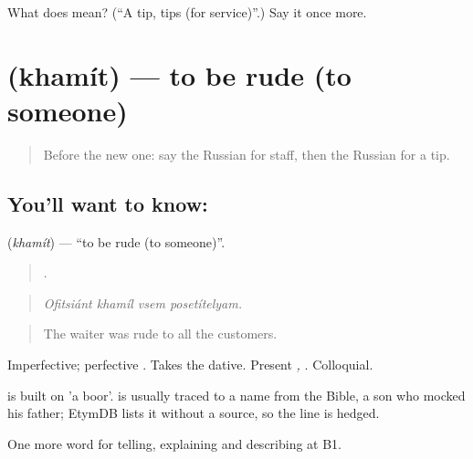 \begin{tcolorbox}[breakable,colback=teal!4,colframe=teal!35!black,title={Before you move on}]
What does  mean? (\textquotedblleft{}A tip, tips (for service)\textquotedblright{}.) Say it once more.
\end{tcolorbox}
\section[\texorpdfstring{\ru{хамить} (khamít)}{хамить (khamít)}]{ (khamít) — to be rude (to someone)}

\label{lesson:RU-C435-khamit}



\begin{quote}
Before the new one: say the Russian for staff, then the Russian for a tip.
\end{quote}

\subsection*{You'll want to know: }
\textbf{} (\emph{khamít}) — \textquotedblleft{}to be rude (to someone)\textquotedblright{}.

\begin{quote}
   .
\end{quote}

\begin{quote}
\emph{Ofitsiánt khamíl vsem posetítelyam.}
\end{quote}

\begin{quote}
The waiter was rude to all the customers.
\end{quote}

Imperfective; perfective \emph{}. Takes the dative. Present \emph{, }. Colloquial.

\begin{cousinweb}
\emph{} is built on \emph{} 'a boor'. \emph{} is usually traced to a name from the Bible, a son who mocked his father; EtymDB lists it without a source, so the line is hedged.
\end{cousinweb}

\begin{grammarlens}[title={What you've built}]
One more word for telling, explaining and describing at B1.
\end{grammarlens}

